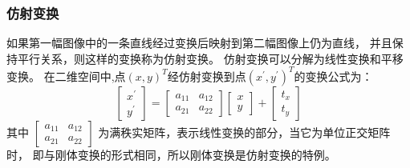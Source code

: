 \subsubsection{仿射变换}
如果第一幅图像中的一条直线经过变换后映射到第二幅图像上仍为直线，
并且保持平行关系，则这样的变换称为仿射变换。
仿射变换可以分解为线性变换和平移变换。
在二维空间中,点$(x,y)^T$经仿射变换到点$(x^\prime,y^\prime)^T$的变换公式为：
\begin{equation}
  \begin{bmatrix}
    x^\prime\\
    y^\prime
  \end{bmatrix}=
  \begin{bmatrix}
    a_{11}& a_{12}\\
    a_{21}& a_{22}
  \end{bmatrix}
  \begin{bmatrix}
    x\\
    y
  \end{bmatrix}+
  \begin{bmatrix}
    t_x\\
    t_y
  \end{bmatrix}
\end{equation}
其中
$\begin{bmatrix}
  a_{11}& a_{12}\\ a_{21}& a_{22} 
\end{bmatrix}$
为满秩实矩阵，表示线性变换的部分，当它为单位正交矩阵时，
即与刚体变换的形式相同，所以刚体变换是仿射变换的特例。
